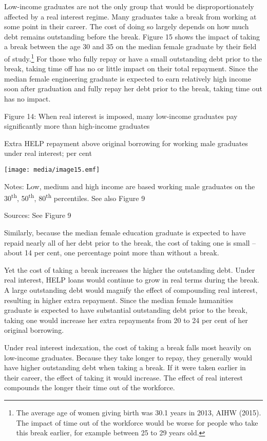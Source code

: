 \documentclass[]{book}
\begin{document}
Low-income graduates are not the only group that would be disproportionately affected by a real interest regime. Many graduates take a break from working at some point in their career. The cost of doing so largely depends on how much debt remains outstanding before the break. Figure 15 shows the impact of taking a break between the age 30 and 35 on the median female graduate by their field of study.\footnote{The average age of women giving birth was 30.1 years in 2013, AIHW (2015). The impact of time out of the workforce would be worse for people who take this break earlier, for example between 25 to 29 years old.} For those who fully repay or have a small outstanding debt prior to the break, taking time off has no or little impact on their total repayment. Since the median female engineering graduate is expected to earn relatively high income soon after graduation and fully repay her debt prior to the break, taking time out has no impact.

\protect\hypertarget{_Ref310586817}{}{}Figure 14: When real interest is imposed, many low-income graduates pay significantly more than high-income graduates

Extra HELP repayment above original borrowing for working male graduates under real interest; per cent

\texttt{[image: media/image15.emf]}

Notes: Low, medium and high income are based working male graduates on the 30\textsuperscript{th}, 50\textsuperscript{th}, 80\textsuperscript{th} percentiles. See also Figure 9

Sources: See Figure 9

Similarly, because the median female education graduate is expected to have repaid nearly all of her debt prior to the break, the cost of taking one is small -- about 14 per cent, one percentage point more than without a break.

Yet the cost of taking a break increases the higher the outstanding debt. Under real interest, HELP loans would continue to grow in real terms during the break. A large outstanding debt would magnify the effect of compounding real interest, resulting in higher extra repayment. Since the median female humanities graduate is expected to have substantial outstanding debt prior to the break, taking one would increase her extra repayments from 20 to 24 per cent of her original borrowing.

Under real interest indexation, the cost of taking a break falls most heavily on low-income graduates. Because they take longer to repay, they generally would have higher outstanding debt when taking a break. If it were taken earlier in their career, the effect of taking it would increase. The effect of real interest compounds the longer their time out of the workforce.
\end{document}
